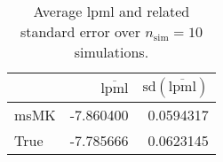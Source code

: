 \begin{table}[H]

\caption{Average lpml and related standard error over $n_{\text{sim}} = 10$ simulations.}
\centering
\begin{tabular}[t]{lrr}
\toprule
  & $\overbar{\text{lpml}}$ & $\text{sd}(\overbar{\text{lpml}})$\\
\midrule
msMK & -7.860400 & 0.0594317\\
True & -7.785666 & 0.0623145\\
\bottomrule
\end{tabular}
\end{table}